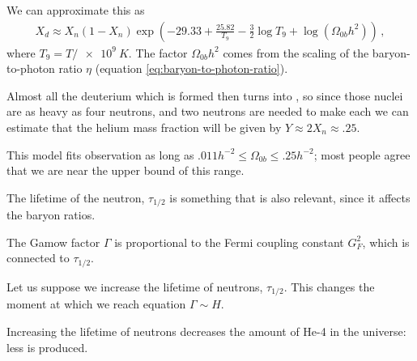 \documentclass[main.tex]{subfiles}
\begin{document}

We can approximate this as 
%
\begin{align}
  X_d \approx X_n (1 - X_n)
  \exp(-29.33 + \frac{25.82}{T_9  } - \frac{3}{2} \log T_9 + \log ( \Omega_{0b} h^2 ))
\,,
\end{align}
%
where \(T_9  =  T / \SI{e9}{K}\). 
The factor \(\Omega_{0b} h^2\) comes from the scaling of the baryon-to-photon ratio \(\eta\) (equation \eqref{eq:baryon-to-photon-ratio}).



Almost all the deuterium which is formed then turns into , so since those nuclei are as heavy as four neutrons, and two neutrons are needed to make each we can estimate that the helium mass fraction will be given by \(Y \approx 2 X_n \approx \num{.25}\). 

This model fits observation as long as \(\num{.011} h^{-2}\leq \Omega_{0b} \leq \num{.25} h^{-2}\); most people agree that we are near the upper bound of this range. 


The lifetime of the neutron, \(\tau_{1/2}\) is something that is also relevant, since it affects the baryon ratios. 

The Gamow factor \(\Gamma \) is proportional to the Fermi coupling constant \(G_F^2\), which is connected to \(\tau_{1/2}\). 

Let us suppose we increase the lifetime of neutrons, \(\tau_{1/2}\). 
This changes the moment at which we reach equation \(\Gamma \sim H\). 

Increasing the lifetime of neutrons decreases the amount of He-4 in the universe: less is produced. 
\end{document}
